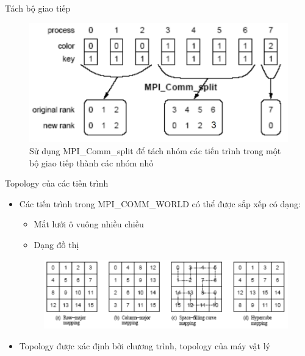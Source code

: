 \documentclass[10pt]{beamer}
\theoremstyle{remark}
\numberwithin{algocf}{section}
\numberwithin{equation}{section}
\numberwithin{dl}{section}
\numberwithin{figure}{section}
\begin{document}
\begin{frame}{Tách bộ giao tiếp}
    \begin{figure}[H]
        \centering
        \includegraphics[width=0.7\linewidth]{figures/MPI/Split_Communicator.png}
        \caption{Sử dụng MPI\_Comm\_split để tách nhóm các tiến trình trong một bộ giao tiếp thành các nhóm nhỏ}
    \end{figure}
\end{frame}

\begin{frame}{Topology của các tiến trình}
    \begin{itemize}
        \item Các tiến trình trong MPI\_COMM\_WORLD có thể được sắp xếp có dạng:
        \begin{itemize}
            \item Mắt lưới ô vuông nhiều chiều
            \item Dạng đồ thị
        \end{itemize}
        \begin{figure}[H]
            \centering
            \includegraphics[height=0.3\textheight]{figures/MPI/Topology.png}
        \end{figure}
        \item Topology được xác định bởi chương trình, topology của máy vật lý
    \end{itemize}
\end{frame}
\end{document}
